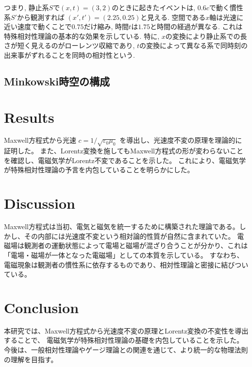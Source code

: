 \documentclass{ltjsarticle}
\begin{document}
つまり, 静止系$S$で$(x, t)= (3, 2)$のときに起きたイベントは, $0.6c$で動く慣性系$S'$から観測すれば
$(x', t')= (2.25, 0.25)$と見える. 
空間である$x$軸は光速に近い速度で動くことで$0.75$だけ縮み, 時間$t$は$1.75$と時間の経過が異なる. 
これは特殊相対性理論の基本的な効果を示している. 
特に, $x$の変換により静止系での長さが短く見えるのがローレンツ収縮であり, $t$の変換によって異なる系で同時刻の出来事がずれることを同時の相対性という. 












\subsection{Minkowski時空の構成}

\section{Results}
Maxwell方程式から光速 $c = 1/\sqrt{\varepsilon_0 \mu_0}$ を導出し、光速度不変の原理を理論的に証明した。
また、Lorentz変換を施してもMaxwell方程式の形が変わらないことを確認し、電磁気学がLorentz不変であることを示した。
これにより、電磁気学が特殊相対性理論の予言を内包していることを明らかにした。

\section{Discussion}
Maxwell方程式は当初、電気と磁気を統一するために構築された理論である。しかし、その内部には光速度不変という相対論的性質が自然に含まれていた。
電磁場は観測者の運動状態によって電場と磁場が混ざり合うことが分かり、これは「電場・磁場が一体となった電磁場」としての本質を示している。
すなわち、電磁現象は観測者の慣性系に依存するものであり、相対性理論と密接に結びついている。

\section{Conclusion}
本研究では、Maxwell方程式から光速度不変の原理とLorentz変換の不変性を導出することで、
電磁気学が特殊相対性理論の基礎を内包していることを示した。
今後は、一般相対性理論やゲージ理論との関連を通じて、より統一的な物理法則の理解を目指す。

\end{document}
